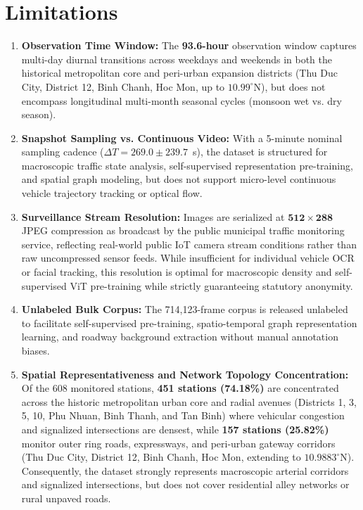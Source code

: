 \documentclass[preprint,12pt]{elsarticle}
\begin{document}
\section{Limitations}
\begin{enumerate}
    \item \textbf{Observation Time Window:} The \textbf{93.6-hour} observation window captures multi-day diurnal transitions across weekdays and weekends in both the historical metropolitan core and peri-urban expansion districts (Thu Duc City, District 12, Binh Chanh, Hoc Mon, up to $10.99^\circ\text{N}$), but does not encompass longitudinal multi-month seasonal cycles (monsoon wet vs. dry season).
    \item \textbf{Snapshot Sampling vs. Continuous Video:} With a 5-minute nominal sampling cadence ($\Delta T = 269.0 \pm 239.7$~s), the dataset is structured for macroscopic traffic state analysis, self-supervised representation pre-training, and spatial graph modeling, but does not support micro-level continuous vehicle trajectory tracking or optical flow.
    \item \textbf{Surveillance Stream Resolution:} Images are serialized at $\mathbf{512 \times 288}$ JPEG compression as broadcast by the public municipal traffic monitoring service, reflecting real-world public IoT camera stream conditions rather than raw uncompressed sensor feeds. While insufficient for individual vehicle OCR or facial tracking, this resolution is optimal for macroscopic density and self-supervised ViT pre-training while strictly guaranteeing statutory anonymity.
    \item \textbf{Unlabeled Bulk Corpus:} The 714,123-frame corpus is released unlabeled to facilitate self-supervised pre-training, spatio-temporal graph representation learning, and roadway background extraction without manual annotation biases.
    \item \textbf{Spatial Representativeness and Network Topology Concentration:} Of the 608 monitored stations, \textbf{451 stations (74.18\%)} are concentrated across the historic metropolitan urban core and radial avenues (Districts 1, 3, 5, 10, Phu Nhuan, Binh Thanh, and Tan Binh) where vehicular congestion and signalized intersections are densest, while \textbf{157 stations (25.82\%)} monitor outer ring roads, expressways, and peri-urban gateway corridors (Thu Duc City, District 12, Binh Chanh, Hoc Mon, extending to $10.9883^\circ\text{N}$). Consequently, the dataset strongly represents macroscopic arterial corridors and signalized intersections, but does not cover residential alley networks or rural unpaved roads.

\end{enumerate}
\end{document}
